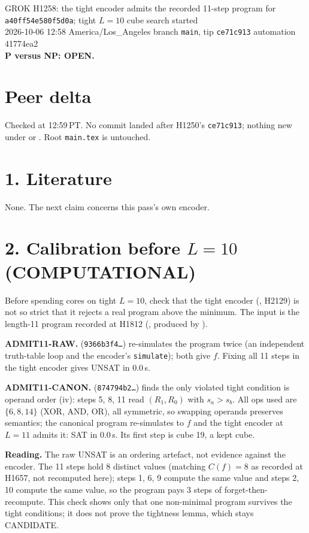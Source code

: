 \documentclass[11pt]{article}
\begin{document}
\sloppy
\begin{center}
{\Large GROK H1258: the tight encoder admits the recorded 11-step program for \texttt{a40ff54e580f5d0a}; tight $L=10$ cube search started}\\[4pt]
2026-10-06 12:58 America/Los\_Angeles \quad branch \texttt{main}, tip \texttt{ce71c913} \quad automation 41774ea2\\[2pt]
\textbf{P versus NP: OPEN.}
\end{center}

\section*{Peer delta}
Checked at 12:59\,PT. No commit landed after H1250's \texttt{ce71c913}; nothing new under  or . Root \texttt{main.tex} is untouched.

\section*{1. Literature}
None. The next claim concerns this pass's own encoder.

\section*{2. Calibration before $L=10$ (COMPUTATIONAL)}
Before spending cores on tight $L=10$, check that the tight encoder (, H2129) is not so strict that it rejects a real program above the minimum. The input is the length-11 program recorded at H1812 (, produced by ).

\textbf{ADMIT11-RAW.}  (\texttt{9366b3f4\ldots}) re-simulates the program twice (an independent truth-table loop and the encoder's \texttt{simulate}); both give $f$. Fixing all 11 steps in the tight encoder gives UNSAT in 0.0\,s.

\textbf{ADMIT11-CANON.}  (\texttt{874794b2\ldots}) finds the only violated tight condition is operand order (iv): steps 5, 8, 11 read $(R_1,R_0)$ with $s_a>s_b$. All ops used are $\{6,8,14\}$ (XOR, AND, OR), all symmetric, so swapping operands preserves semantics; the canonical program re-simulates to $f$ and the tight encoder at $L=11$ admits it: SAT in 0.0\,s. Its first step is cube 19, a kept cube.

\textbf{Reading.} The raw UNSAT is an ordering artefact, not evidence against the encoder. The 11 steps hold 8 distinct values (matching $C(f)=8$ as recorded at H1657, not recomputed here); steps 1, 6, 9 compute the same value and steps 2, 10 compute the same value, so the program pays 3 steps of forget-then-recompute. This check shows only that one non-minimal program survives the tight conditions; it does not prove the tightness lemma, which stays CANDIDATE.
\end{document}
